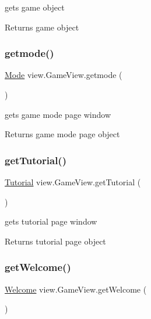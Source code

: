gets game object 

\begin{DoxyReturn}{Returns}
game object 
\end{DoxyReturn}
\hypertarget{classview_1_1_game_view_a427afb80cd453fd611670936793fb556}{}\label{classview_1_1_game_view_a427afb80cd453fd611670936793fb556} 
\subsubsection{\texorpdfstring{getmode()}{getmode()}}
{\footnotesize\ttfamily \hyperlink{classview_1_1_mode}{Mode} view.\+Game\+View.\+getmode (\begin{DoxyParamCaption}{ }\end{DoxyParamCaption})}



gets game mode page window 

\begin{DoxyReturn}{Returns}
game mode page object 
\end{DoxyReturn}
\hypertarget{classview_1_1_game_view_af2d07759d1cde26a4a4d8176baeb0739}{}\label{classview_1_1_game_view_af2d07759d1cde26a4a4d8176baeb0739} 
\subsubsection{\texorpdfstring{get\+Tutorial()}{getTutorial()}}
{\footnotesize\ttfamily \hyperlink{classview_1_1_tutorial}{Tutorial} view.\+Game\+View.\+get\+Tutorial (\begin{DoxyParamCaption}{ }\end{DoxyParamCaption})}



gets tutorial page window 

\begin{DoxyReturn}{Returns}
tutorial page object 
\end{DoxyReturn}
\hypertarget{classview_1_1_game_view_adaeb63e182332aee35ca0e0591332add}{}\label{classview_1_1_game_view_adaeb63e182332aee35ca0e0591332add} 
\subsubsection{\texorpdfstring{get\+Welcome()}{getWelcome()}}
{\footnotesize\ttfamily \hyperlink{classview_1_1_welcome}{Welcome} view.\+Game\+View.\+get\+Welcome (\begin{DoxyParamCaption}{ }\end{DoxyParamCaption})}



